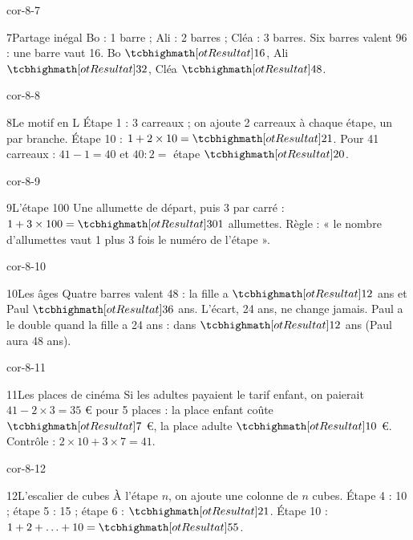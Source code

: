 \begin{blocLivre}{cor-8-7}\begin{corrige}{7}{Partage inégal}
Bo : 1 barre ; Ali : 2 barres ; Cléa : 3 barres. Six barres valent 96 : une barre vaut 16. Bo $\res{16}$, Ali $\res{32}$, Cléa $\res{48}$.
\end{corrige}\end{blocLivre}
\begin{blocLivre}{cor-8-8}\begin{corrige}{8}{Le motif en L}
Étape 1 : 3 carreaux ; on ajoute 2 carreaux à chaque étape, un par branche. Étape 10 : $1+2\times10=\res{21}$. Pour 41 carreaux : $41-1=40$ et $40:2=$ étape $\res{20}$.
\label{fig-cor-8-8}
\end{corrige}\end{blocLivre}
\begin{blocLivre}{cor-8-9}\begin{corrige}{9}{L’étape 100}
Une allumette de départ, puis 3 par carré : $1+3\times100=\res{301}$ allumettes. Règle : « le nombre d’allumettes vaut 1 plus 3 fois le numéro de l’étape ».
\end{corrige}\end{blocLivre}
\begin{blocLivre}{cor-8-10}\begin{corrige}{10}{Les âges}
Quatre barres valent 48 : la fille a $\res{12}$ ans et Paul $\res{36}$ ans. L’écart, 24 ans, ne change jamais. Paul a le double quand la fille a 24 ans : dans $\res{12}$ ans (Paul aura 48 ans).
\end{corrige}\end{blocLivre}
\begin{blocLivre}{cor-8-11}\begin{corrige}{11}{Les places de cinéma}
Si les adultes payaient le tarif enfant, on paierait $41-2\times3=35$ € pour 5 places : la place enfant coûte $\res7$ €, la place adulte $\res{10}$ €. Contrôle : $2\times10+3\times7=41$.
\end{corrige}\end{blocLivre}
\begin{blocLivre}{cor-8-12}\begin{corrige}{12}{L’escalier de cubes}
À l’étape $n$, on ajoute une colonne de $n$ cubes. Étape 4 : 10 ; étape 5 : 15 ; étape 6 : $\res{21}$. Étape 10 : $1+2+\ldots+10=\res{55}$.
\label{fig-cor-8-12}
\end{corrige}\end{blocLivre}
